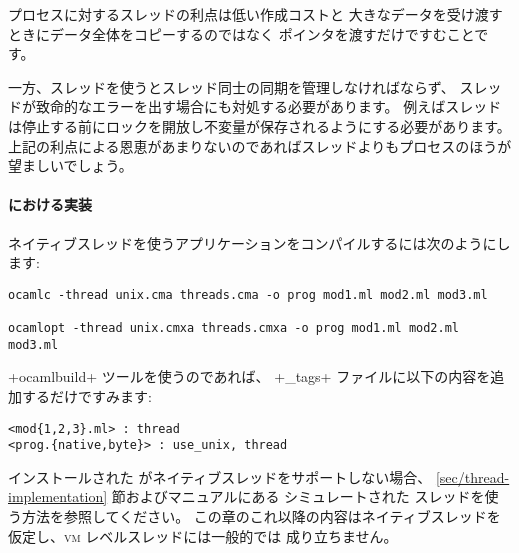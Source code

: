 プロセスに対するスレッドの利点は低い作成コストと
大きなデータを受け渡すときにデータ全体をコピーするのではなく
ポインタを渡すだけですむことです。

一方、スレッドを使うとスレッド同士の同期を管理しなければならず、
スレッドが致命的なエラーを出す場合にも対処する必要があります。
例えばスレッドは停止する前にロックを開放し不変量が保存されるようにする必要があります。
上記の利点による恩恵があまりないのであればスレッドよりもプロセスのほうが望ましいでしょう。

\paragraph{{\ocaml} における実装}

ネイティブスレッドを使うアプリケーションをコンパイルするには次のようにします:
\begin{lstlisting}
ocamlc -thread unix.cma threads.cma -o prog mod1.ml mod2.ml mod3.ml

ocamlopt -thread unix.cmxa threads.cmxa -o prog mod1.ml mod2.ml mod3.ml
\end{lstlisting}
\ml+ocamlbuild+ ツールを使うのであれば、
\ml+_tags+ ファイルに以下の内容を追加するだけですみます:
\begin{lstlisting}
<mod{1,2,3}.ml> : thread
<prog.{native,byte}> : use_unix, thread
\end{lstlisting}
%
インストールされた \ocaml がネイティブスレッドをサポートしない場合、
\ref{sec/thread-implementation} 節およびマニュアルにある
シミュレートされた   スレッドを使う方法を参照してください。
この章のこれ以降の内容はネイティブスレッドを仮定し、\textsc{vm} レベルスレッドには一般的では
成り立ちません。

